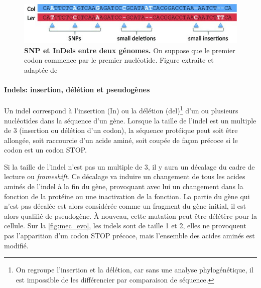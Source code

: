 \begin{figure}[htbp]
    \centering
    \includegraphics[width=.65\textwidth]{images/Mec_evo.jpg}
    \caption[Identification des SNP et indels entre 2 génomes]{\textbf{SNP et InDels entre deux génomes.} On suppose que le premier codon commence par le premier nucléotide. Figure extraite et adaptée de \cite{qi_detection_2014}}
    \label{fig:mec_evo}
\end{figure}

\paragraph{Indels: insertion, délétion et pseudogènes}

Un indel correspond à l'insertion (In) ou la délétion (del)\footnote{On regroupe l'insertion et la délétion, car sans une analyse phylogénétique, il est impossible de les différencier par comparaison de séquence.} d'un ou plusieurs nucléotides dans la séquence d'un gène. Lorsque la taille de l'indel est un multiple de 3 (insertion ou délétion d'un codon), la séquence protéique peut soit être allongée, soit raccourcie d'un acide aminé, soit coupée de façon précoce si le codon est un codon STOP.

Si la taille de l'indel n'est pas un multiple de 3, il y aura un décalage du cadre de lecture ou \textit{frameshift}. Ce décalage va induire un changement de tous les acides aminés de l'indel à la fin du gène, provoquant avec lui un changement dans la fonction de la protéine ou une inactivation de la fonction. La partie du gène qui n'est pas décalée est alors considérée comme un fragment du gène initial, il est alors qualifié de pseudogène. À nouveau, cette mutation peut être délétère pour la cellule. Sur la \autoref{fig:mec_evo}, les indels sont de taille 1 et 2, elles ne provoquent pas l'apparition d'un codon STOP précoce, mais l'ensemble des acides aminés est modifié.

